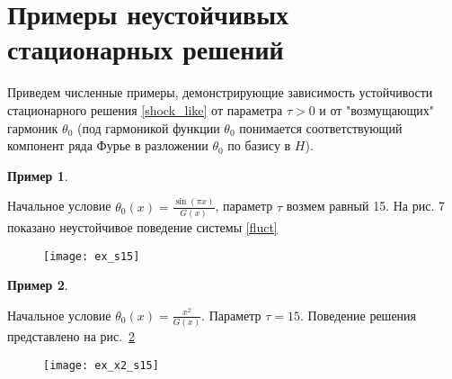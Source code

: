 \section{Примеры неустойчивых стационарных решений}

Приведем численные примеры, демонстрирующие зависимость устойчивости
стационарного решения \eqref{shock_like} от параметра $\tau > 0$ и от
"возмущающих" гармоник $\theta_0$ (под гармоникой функции $\theta_0$ понимается
соответствующий компонент ряда Фурье в разложении $\theta_0$ по базису в $H$).
\newtheorem{exmp_bur}{Пример}
\begin{exmp_bur}
\end{exmp_bur}

Начальное условие $\theta_0(x) = \frac{\sin(\pi x)}{G(x)}$, параметр $\tau$ 
возмем равный 15. На рис. 7 показано неустойчивое поведение системы
\eqref{fluct}

\begin{figure}[h]
    \centering
    \texttt{[image: ex\_s15]}
    \caption{}
    \label{fig:fig07}
\end{figure}

\begin{exmp_bur}
\end{exmp_bur}
Начальное условие $\theta_0(x) = \frac{x^2}{G(x)}$. Параметр $\tau = 15$.
Поведение решения представлено на рис.~\ref{fig:fig08}

\begin{figure}[h]
    \centering
    \texttt{[image: ex\_x2\_s15]}
    \caption{}
    \label{fig:fig08}
\end{figure}
